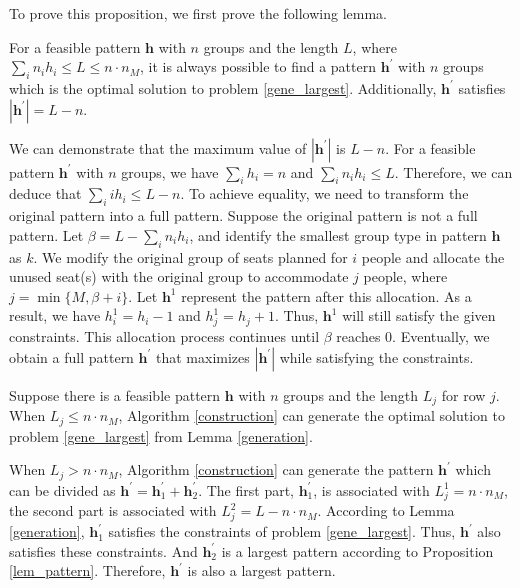 \begin{pf}
To prove this proposition, we first prove the following lemma.

\begin{lem}\label{generation}
  For a feasible pattern $\bm{h}$ with $n$ groups and the length $L$, where $\sum_{i} n_{i} h_{i} \leq L \leq n \cdot n_{M}$, it is always possible to find a pattern $\bm{h}^{'}$ with $n$ groups which is the optimal solution to problem \eqref{gene_largest}. Additionally, $\bm{h}^{'}$ satisfies $|\bm{h}^{'}| = L - n$.
\end{lem}
  
\begin{pf}
We can demonstrate that the maximum value of $|\bm{h}^{'}|$ is $L - n$. For a feasible pattern $\bm{h}^{'}$ with $n$ groups, we have $\sum_{i}{h_i} = n$ and $\sum_{i}{n_i h_i} \leq L$. Therefore, we can deduce that $\sum_{i} {i h_i} \leq L - n$. To achieve equality, we need to transform the original pattern into a full pattern. Suppose the original pattern is not a full pattern. Let $\beta = L - \sum_{i} n_{i} h_{i}$, and identify the smallest group type in pattern $\bm{h}$ as $k$. We modify the original group of seats planned for $i$ people and allocate the unused seat(s) with the original group to accommodate $j$ people, where $j = \min\{M, \beta + i\}$. Let $\bm{h}^{1}$ represent the pattern after this allocation. As a result, we have $h^{1}_{i} = h_{i} -1$ and $h^{1}_{j} = h_{j} +1$. Thus, $\bm{h}^{1}$ will still satisfy the given constraints. This allocation process continues until $\beta$ reaches $0$. Eventually, we obtain a full pattern $\bm{h}^{'}$ that maximizes $|\bm{h}^{'}|$ while satisfying the constraints.
\end{pf}

Suppose there is a feasible pattern $\bm{h}$ with $n$ groups and the length $L_{j}$ for row $j$. When $L_{j} \leq n \cdot n_M$, Algorithm \ref{construction} can generate the optimal solution to problem \eqref{gene_largest} from Lemma \ref{generation}.

When $L_{j} > n \cdot n_M$, Algorithm \ref{construction} can generate the pattern $\bm{h}^{'}$ which can be divided as $\bm{h}^{'} = \bm{h}^{'}_1 + \bm{h}^{'}_2$. The first part, $\bm{h}^{'}_1$, is associated with $L^1_{j} = n \cdot n_M$, the second part is associated with $L^2_{j} = L - n \cdot n_M$. According to Lemma \ref{generation}, $\bm{h}^{'}_1$ satisfies the constraints of problem \eqref{gene_largest}. Thus, $\bm{h}^{'}$ also satisfies these constraints. And $\bm{h}^{'}_2$ is a largest pattern according to Proposition \ref{lem_pattern}. Therefore, $\bm{h}^{'}$ is also a largest pattern.
\end{pf}

